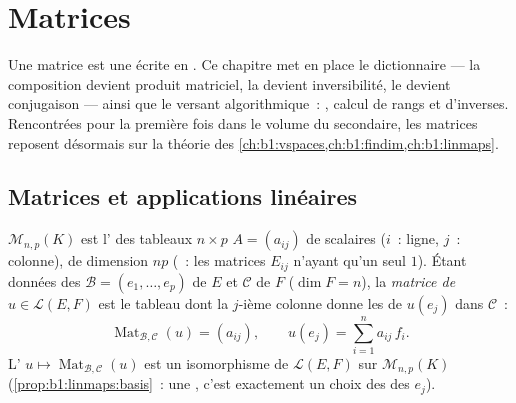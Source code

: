 \chapter{Matrices}\label{ch:b1:matrices}

Une matrice est une  écrite en . Ce
chapitre met en place le dictionnaire --- la composition devient produit
matriciel, la  devient inversibilité, le 
devient conjugaison --- ainsi que le versant algorithmique~: , calcul de rangs et d'inverses. Rencontrées pour la
première fois dans le volume du secondaire, les matrices reposent
désormais sur la théorie des
\cref{ch:b1:vspaces,ch:b1:findim,ch:b1:linmaps}.

\section{Matrices et applications linéaires}

\begin{definition}\label{def:b1:matrices:def}
$\mathcal{M}_{n,p}(K)$ est l' des tableaux $n \times p$
$A = (a_{ij})$ de scalaires ($i$~: ligne, $j$~: colonne), de dimension
$np$ (~: les matrices $E_{ij}$ n'ayant qu'un seul $1$). Étant
données des  $\mathcal{B} = (e_1, \dots, e_p)$ de $E$ et
$\mathcal{C}$ de $F$ ($\dim F = n$), la \emph{matrice de $u \in
\mathcal{L}(E, F)$} est le tableau dont la $j$-ième colonne donne les
 de $u(e_j)$ dans $\mathcal{C}$~:
\[
\operatorname{Mat}_{\mathcal{B},\mathcal{C}}(u) = (a_{ij}),
\qquad u(e_j) = \sum_{i=1}^{n} a_{ij}\, f_i .
\]
L' $u \mapsto \operatorname{Mat}_{\mathcal{B},\mathcal{C}}(u)$
est un isomorphisme de $\mathcal{L}(E, F)$ sur
$\mathcal{M}_{n,p}(K)$ (\cref{prop:b1:linmaps:basis}~: une , c'est exactement un choix des  des $e_j$).
\end{definition}


